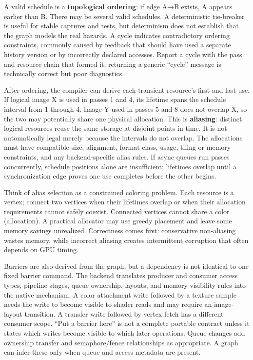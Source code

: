 A valid schedule is a \textbf{topological ordering}: if edge A→B exists, A appears earlier than B. There may be several valid schedules. A deterministic tie-breaker is useful for stable captures and tests, but determinism does not establish that the graph models the real hazards. A cycle indicates contradictory ordering constraints, commonly caused by feedback that should have used a separate history version or by incorrectly declared accesses. Report a cycle with the pass and resource chain that formed it; returning a generic ``cycle'' message is technically correct but poor diagnostics.

After ordering, the compiler can derive each transient resource's first and last use. If logical image X is used in passes 1 and 4, its lifetime spans the schedule interval from 1 through 4. Image Y used in passes 5 and 8 does not overlap X, so the two may potentially share one physical allocation. This is \textbf{aliasing}: distinct logical resources reuse the same storage at disjoint points in time. It is not automatically legal merely because the intervals do not overlap. The allocations must have compatible size, alignment, format class, usage, tiling or memory constraints, and any backend-specific alias rules. If async queues run passes concurrently, schedule positions alone are insufficient; lifetimes overlap until a synchronization edge proves one use completes before the other begins.

Think of alias selection as a constrained coloring problem. Each resource is a vertex; connect two vertices when their lifetimes overlap or when their allocation requirements cannot safely coexist. Connected vertices cannot share a color (allocation). A practical allocator may use greedy placement and leave some memory savings unrealized. Correctness comes first: conservative non-aliasing wastes memory, while incorrect aliasing creates intermittent corruption that often depends on GPU timing.

Barriers are also derived from the graph, but a dependency is not identical to one fixed barrier command. The backend translates producer and consumer access types, pipeline stages, queue ownership, layouts, and memory visibility rules into the native mechanism. A color attachment write followed by a texture sample needs the write to become visible to shader reads and may require an image-layout transition. A transfer write followed by vertex fetch has a different consumer scope. ``Put a barrier here'' is not a complete portable contract unless it states which writes become visible to which later operations. Queue changes add ownership transfer and semaphore/fence relationships as appropriate. A graph can infer these only when queue and access metadata are present.

